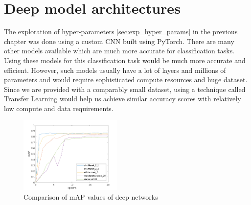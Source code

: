 \documentclass[10pt,twocolumn,letterpaper]{article}
\begin{document}
\section{Deep model architectures}
\label{sec:deep_model_arch}

The exploration of hyper-parameters \ref{sec:exp_hyper_params} in the previous chapter was done using a custom CNN built using PyTorch. There
are many other models available which are much more accurate for classification tasks. Using these models for this classification
task would be much more accurate and efficient. However, such models usually have a lot of layers and millions of
parameters and would require sophisticated compute resources and huge dataset. Since we are provided with a comparably
small dataset, using a technique called Transfer Learning would help us achieve similar accuracy scores with relatively
low compute and data requirements.



\begin{figure}[htbp]
  \begin{center}
    \includegraphics[width=0.45\textwidth]{./assets/deep_nets_comparison.png}
    \captionsetup{justification=centering}
    \caption{Comparison of mAP values of deep networks}
    \label{fig:deep_nets_comparison}
  \end{center}
\end{figure}
\end{document}
